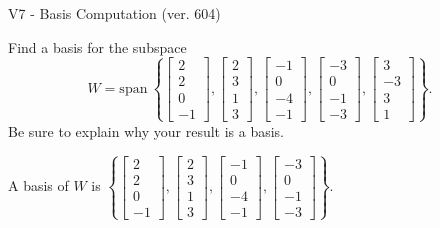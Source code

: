 \begin{exercise}
  \begin{exerciseTitle}V7 - Basis Computation (ver. 604)\end{exerciseTitle}
  \begin{exerciseStatement}
    Find a basis for the subspace 
\[W=\mathrm{span}\ \left\{\left[\begin{array}{r}
2 \\
2 \\
0 \\
-1
\end{array}\right] , \left[\begin{array}{r}
2 \\
3 \\
1 \\
3
\end{array}\right] , \left[\begin{array}{r}
-1 \\
0 \\
-4 \\
-1
\end{array}\right] , \left[\begin{array}{r}
-3 \\
0 \\
-1 \\
-3
\end{array}\right] , \left[\begin{array}{r}
3 \\
-3 \\
3 \\
1
\end{array}\right]\right\}.\]
 Be sure to explain why your result is a basis.


  \end{exerciseStatement}
  \begin{exerciseAnswer}
   A basis of \(W\) is  \(\left\{\left[\begin{array}{r}
2 \\
2 \\
0 \\
-1
\end{array}\right] , \left[\begin{array}{r}
2 \\
3 \\
1 \\
3
\end{array}\right] , \left[\begin{array}{r}
-1 \\
0 \\
-4 \\
-1
\end{array}\right] , \left[\begin{array}{r}
-3 \\
0 \\
-1 \\
-3
\end{array}\right]\right\}\).
  


  \end{exerciseAnswer}
\end{exercise}